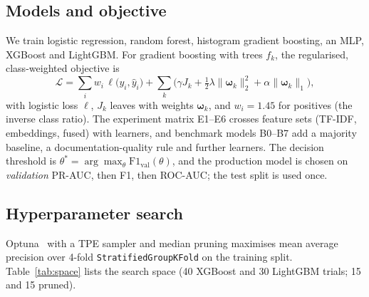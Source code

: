\documentclass[conference]{IEEEtran}
\begin{document}
\subsection{Models and objective}
We train logistic regression, random forest, histogram gradient boosting, an MLP, XGBoost and LightGBM. For gradient boosting with trees $f_k$, the regularised, class-weighted objective is
\begin{equation}
\mathcal{L}=\sum_{i} w_i\,\ell\big(y_i,\hat y_i\big)+\sum_{k}\Big(\gamma J_k+\tfrac12\lambda\|\boldsymbol\omega_k\|_2^2+\alpha\|\boldsymbol\omega_k\|_1\Big),
\end{equation}
with logistic loss $\ell$, $J_k$ leaves with weights $\boldsymbol\omega_k$, and $w_i=1.45$ for positives (the inverse class ratio). The experiment matrix E1--E6 crosses feature sets (TF-IDF, embeddings, fused) with learners, and benchmark models B0--B7 add a majority baseline, a documentation-quality rule and further learners. The decision threshold is $\theta^*=\arg\max_\theta \mathrm{F1}_{\text{val}}(\theta)$, and the production model is chosen on \emph{validation} PR-AUC, then F1, then ROC-AUC; the test split is used once.

\subsection{Hyperparameter search}
Optuna~\cite{optuna} with a TPE sampler and median pruning maximises mean average precision over 4-fold \texttt{StratifiedGroupKFold} on the training split. Table~\ref{tab:space} lists the search space (40 XGBoost and 30 LightGBM trials; 15 and 15 pruned).
\begin{table}[t]\centering\caption{Optuna search space (log = log-uniform)}\label{tab:space}
\end{table}
\end{document}
